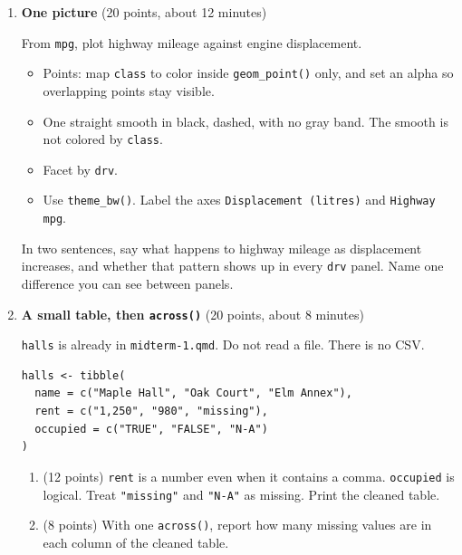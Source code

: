 \documentclass[11pt]{article}
\begin{document}
\begin{enumerate}
\begin{enumerate}[label=\alph*., leftmargin=1.7em, itemsep=0.55em]
  \item (5 points) Two short pipelines.
  \begin{itemize}
    \item Drop \texttt{starwars} rows where \texttt{hair\_color} or \texttt{skin\_color} is missing, then report how many distinct pairs of those two columns remain.
    \item \texttt{mtcars} stores the car name as a row name. Make that a column called \texttt{car}. Keep cars with \texttt{mpg} of at least 30. Return \texttt{car}, \texttt{mpg}, and \texttt{cyl}, arranged by \texttt{mpg}, highest first.
  \end{itemize}
\end{enumerate}

\item \textbf{One picture} (20 points, about 12 minutes)

From \texttt{mpg}, plot highway mileage against engine displacement.
\begin{itemize}
  \item Points: map \texttt{class} to color inside \texttt{geom\_point()} only, and set an alpha so overlapping points stay visible.
  \item One straight smooth in black, dashed, with no gray band. The smooth is not colored by \texttt{class}.
  \item Facet by \texttt{drv}.
  \item Use \texttt{theme\_bw()}. Label the axes \texttt{Displacement (litres)} and \texttt{Highway mpg}.
\end{itemize}
In two sentences, say what happens to highway mileage as displacement increases, and whether that pattern shows up in every \texttt{drv} panel. Name one difference you can see between panels.

\item \textbf{A small table, then \texttt{across()}} (20 points, about 8 minutes)

\texttt{halls} is already in \texttt{midterm-1.qmd}. Do not read a file. There is no CSV.

\begin{lstlisting}
halls <- tibble(
  name = c("Maple Hall", "Oak Court", "Elm Annex"),
  rent = c("1,250", "980", "missing"),
  occupied = c("TRUE", "FALSE", "N-A")
)
\end{lstlisting}

\begin{enumerate}[label=\alph*., leftmargin=1.7em, itemsep=0.55em]
  \item (12 points) \texttt{rent} is a number even when it contains a comma. \texttt{occupied} is logical. Treat \texttt{"missing"} and \texttt{"N-A"} as missing. Print the cleaned table.
  \item (8 points) With one \texttt{across()}, report how many missing values are in each column of the cleaned table.
\end{enumerate}

\end{enumerate}
\end{document}
